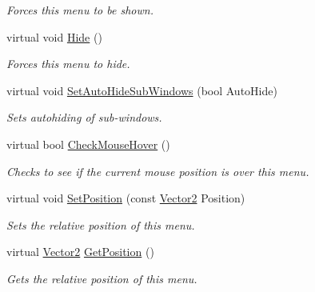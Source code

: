 \begin{DoxyCompactItemize}
\begin{DoxyCompactList}\small\item\em Forces this menu to be shown. \item\end{DoxyCompactList}\item 
\hypertarget{classphys_1_1UI_1_1Menu_a23f7b18c8bae528dc15bf8f3ff40d435}{
virtual void \hyperlink{classphys_1_1UI_1_1Menu_a23f7b18c8bae528dc15bf8f3ff40d435}{Hide} ()}
\label{d6/dd3/classphys_1_1UI_1_1Menu_a23f7b18c8bae528dc15bf8f3ff40d435}

\begin{DoxyCompactList}\small\item\em Forces this menu to hide. \item\end{DoxyCompactList}\item 
virtual void \hyperlink{classphys_1_1UI_1_1Menu_a5525e3823dcd23269cd410dfb2a1e232}{SetAutoHideSubWindows} (bool AutoHide)
\begin{DoxyCompactList}\small\item\em Sets autohiding of sub-\/windows. \item\end{DoxyCompactList}\item 
virtual bool \hyperlink{classphys_1_1UI_1_1Menu_af2514d2614322856f604be2e167d0872}{CheckMouseHover} ()
\begin{DoxyCompactList}\small\item\em Checks to see if the current mouse position is over this menu. \item\end{DoxyCompactList}\item 
virtual void \hyperlink{classphys_1_1UI_1_1Menu_afb571168819d4c78678d7a195e54b389}{SetPosition} (const \hyperlink{classphys_1_1Vector2}{Vector2} Position)
\begin{DoxyCompactList}\small\item\em Sets the relative position of this menu. \item\end{DoxyCompactList}\item 
virtual \hyperlink{classphys_1_1Vector2}{Vector2} \hyperlink{classphys_1_1UI_1_1Menu_a3c19fe2596fe4049325cc580daa70387}{GetPosition} ()
\begin{DoxyCompactList}\small\item\em Gets the relative position of this menu. \item\end{DoxyCompactList}\item 

\end{DoxyCompactItemize}

